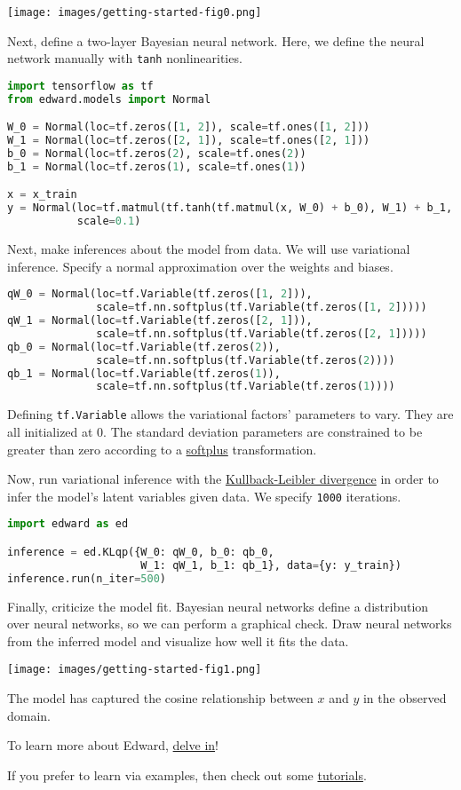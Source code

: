\texttt{[image: images/getting-started-fig0.png]}

Next, define a two-layer Bayesian neural network. Here, we
define the neural network manually with \texttt{tanh} nonlinearities.

\begin{lstlisting}[language=Python]
import tensorflow as tf
from edward.models import Normal

W_0 = Normal(loc=tf.zeros([1, 2]), scale=tf.ones([1, 2]))
W_1 = Normal(loc=tf.zeros([2, 1]), scale=tf.ones([2, 1]))
b_0 = Normal(loc=tf.zeros(2), scale=tf.ones(2))
b_1 = Normal(loc=tf.zeros(1), scale=tf.ones(1))

x = x_train
y = Normal(loc=tf.matmul(tf.tanh(tf.matmul(x, W_0) + b_0), W_1) + b_1,
           scale=0.1)
\end{lstlisting}

Next, make inferences about the model from data. We will use variational
inference. Specify a normal approximation over the weights and biases.

\begin{lstlisting}[language=Python]
qW_0 = Normal(loc=tf.Variable(tf.zeros([1, 2])),
              scale=tf.nn.softplus(tf.Variable(tf.zeros([1, 2]))))
qW_1 = Normal(loc=tf.Variable(tf.zeros([2, 1])),
              scale=tf.nn.softplus(tf.Variable(tf.zeros([2, 1]))))
qb_0 = Normal(loc=tf.Variable(tf.zeros(2)),
              scale=tf.nn.softplus(tf.Variable(tf.zeros(2))))
qb_1 = Normal(loc=tf.Variable(tf.zeros(1)),
              scale=tf.nn.softplus(tf.Variable(tf.zeros(1))))
\end{lstlisting}

Defining \texttt{tf.Variable} allows the variational factors'
parameters to vary. They are all initialized at 0. The standard
deviation parameters are constrained to be greater than zero according
to a
\href{https://en.wikipedia.org/wiki/Rectifier_(neural_networks)}{softplus}
transformation.

Now, run variational inference with the
\href{https://en.wikipedia.org/wiki/Kullback–Leibler_divergence}{Kullback-Leibler divergence}
in order to infer the model's latent variables given data.
We specify \texttt{1000} iterations.

\begin{lstlisting}[language=Python]
import edward as ed

inference = ed.KLqp({W_0: qW_0, b_0: qb_0,
                     W_1: qW_1, b_1: qb_1}, data={y: y_train})
inference.run(n_iter=500)
\end{lstlisting}

Finally, criticize the model fit. Bayesian neural networks define a distribution
over neural networks, so we can perform a graphical check. Draw neural networks
from the inferred model and visualize how well it fits the data.

\texttt{[image: images/getting-started-fig1.png]}

The model has captured the cosine relationship between $x$ and $y$
in the observed domain.

To learn more about Edward, \href{/api}{delve in}!

If you prefer to learn via examples, then check out some
\href{/tutorials/}{tutorials}.

